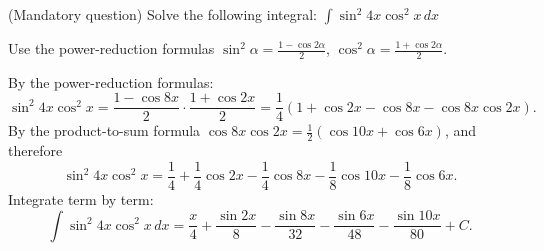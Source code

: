 
\begin{question}
(Mandatory question)
Solve the following integral:
$\displaystyle\int\sin^2 4x\cos^2 x\,dx$
\end{question}

\begin{hint}
Use the power-reduction formulas $\sin^2\alpha=\frac{1-\cos2\alpha}{2}$, $\cos^2\alpha=\frac{1+\cos2\alpha}{2}$.
\end{hint}

\begin{solution}
By the power-reduction formulas:
\[ \sin^2 4x\cos^2x=\frac{1-\cos8x}{2}\cdot\frac{1+\cos2x}{2}=\frac14\left(1+\cos2x-\cos8x-\cos8x\cos2x\right). \]
By the product-to-sum formula $\cos8x\cos2x=\frac12(\cos10x+\cos6x)$, and therefore
\[ \sin^2 4x\cos^2x=\frac14+\frac14\cos2x-\frac14\cos8x-\frac18\cos10x-\frac18\cos6x. \]
Integrate term by term:
\[ \boxed{\int\sin^2 4x\cos^2x\,dx=\frac{x}{4}+\frac{\sin2x}{8}-\frac{\sin8x}{32}-\frac{\sin6x}{48}-\frac{\sin10x}{80}+C}. \]
\end{solution}
